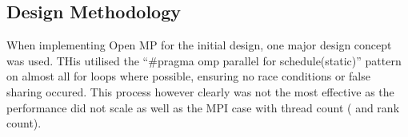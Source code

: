 \subsection{Design Methodology}
When implementing Open MP for the initial design, one major design concept was used.
THis utilised the ``\#pragma omp parallel for schedule(static)'' pattern on almost all for loops where possible, ensuring no race conditions or false sharing occured.
This process however clearly was not the most effective as the performance did not scale as well as the MPI case with thread count ( and rank count).
